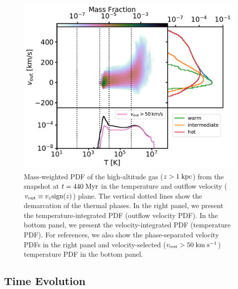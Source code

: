 \documentclass[twocolumn]{aastex62}
\newcommand\kms{\; {\rm km}\;{\rm s}^{-1}}
\newcommand\Myr{\;{\rm Myr}}
\newcommand\kpc{\;{\rm kpc}}
\begin{document}
\begin{figure} 
	\centering
	\includegraphics[width=\columnwidth]{pdfs.pdf}
	\caption{Mass-weighted PDF of the high-altitude gas ($z>1\kpc$) from the snapshot at $t=440\Myr$ in the temperature and outflow velocity ($v_{\rm out} \equiv v_z{\rm sign}(z)$) plane. The vertical dotted lines show the demarcation of the thermal phases. In the right panel, we present the temperature-integrated PDF (outflow velocity PDF). In the bottom panel, we present the velocity-integrated PDF (temperature PDF). For references, we also show the phase-separated velocity PDFs in the right panel and velocity-selected ($v_{\rm out}>50\kms$) temperature PDF in the bottom panel.}
	\label{fig:pdfs}
\end{figure}

\subsection{Time Evolution}\label{subsec:tigress_time_evol}
\end{document}
